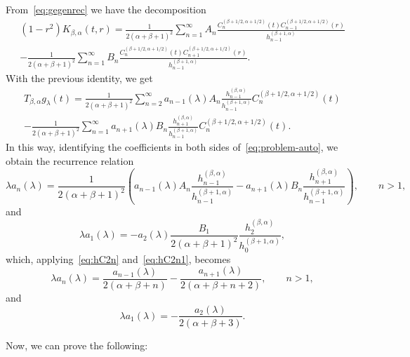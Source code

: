 \documentclass[12pt,a4paper]{amsart}
\theoremstyle{plain}
\theoremstyle{definition}
\begin{document}
From~\eqref{eq:gegenrec} we have the decomposition
\begin{multline*}
  (1-r^2)K_{\beta,\alpha}(t,r)
  = \frac{1}{2(\alpha+\beta+1)^2} \sum_{n=1}^{\infty} A_n
  \frac{C_n^{(\beta+1/2,\alpha+1/2)}(t)
  C_{n-1}^{(\beta+1/2,\alpha+1/2)}(r)} {h_{n-1}^{(\beta+1,\alpha)}}
  \\
  - \frac{1}{2(\alpha+\beta+1)^2} \sum_{n=1}^{\infty} B_n
  \frac{C_n^{(\beta+1/2,\alpha+1/2)}(t)
  C_{n+1}^{(\beta+1/2,\alpha+1/2)}(r)} {h_{n-1}^{(\beta+1,\alpha)}}.
\end{multline*}
With the previous identity, we get
\begin{multline*}
  T_{\beta,\alpha}g_\lambda(t)
  = \frac1{2(\alpha+\beta+1)^2}
  \sum_{n=2}^\infty a_{n-1}(\lambda)A_n
  \frac{h_{n-1}^{(\beta,\alpha)}}{h_{n-1}^{(\beta+1,\alpha)}}
  C_n^{(\beta+1/2,\alpha+1/2)}(t)
  \\
  - \frac1{2(\alpha+\beta+1)^2}
  \sum_{n=1}^\infty a_{n+1}(\lambda) B_n
  \frac{h_{n+1}^{(\beta,\alpha)}}{h_{n-1}^{(\beta+1,\alpha)}}
  C_n^{(\beta+1/2,\alpha+1/2)}(t).
\end{multline*}
In this way, identifying the coefficients in both sides of~\eqref{eq:problem-auto},
we obtain the recurrence relation
\begin{equation*}
  \lambda a_n(\lambda)
  = \frac{1}{2(\alpha+\beta+1)^2}
  \left( a_{n-1}(\lambda) A_n
  \frac{h_{n-1}^{(\beta,\alpha)}}{h_{n-1}^{(\beta+1,\alpha)}}
  - a_{n+1}(\lambda) B_n
  \frac{h_{n+1}^{(\beta,\alpha)}}{h_{n-1}^{(\beta+1,\alpha)}} \right),
\qquad n>1,
\end{equation*}
and
\begin{equation*}
  \lambda a_1(\lambda) = -a_2(\lambda)
  \frac{B_1}{2(\alpha+\beta+1)^2}
  \frac{h_{2}^{(\beta,\alpha)}}{h_{0}^{(\beta+1,\alpha)}},
\end{equation*}
which, applying~\eqref{eq:hC2n} and~\eqref{eq:hC2n1}, becomes
\begin{equation}
\label{eq:recurrencea1}
  \lambda a_n(\lambda)
  = \frac{a_{n-1}(\lambda)}{2(\alpha+\beta+n)}
  -\frac{a_{n+1}(\lambda)}{2(\alpha+\beta+n+2)}, \qquad n>1,
\end{equation}
and
\begin{equation}
\label{eq:recurrencea2}
  \lambda a_1(\lambda) = -\frac{a_2(\lambda)}{2(\alpha+\beta+3)}.
\end{equation}

Now, we can prove the following:
\end{document}
